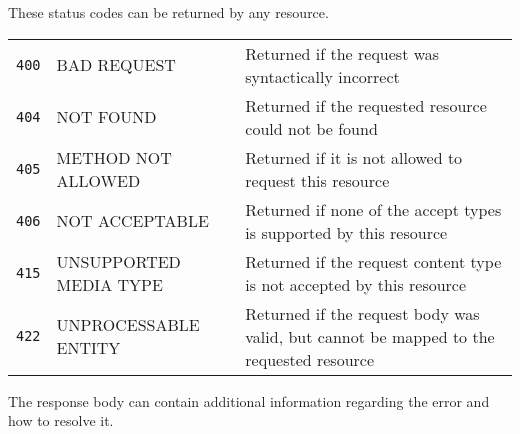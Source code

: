     These status codes can be returned by any resource.
    
    \begin{center}
		\begin{tabularx}{\textwidth}{llX} 
		    \toprule
		    \texttt{400}    &   BAD REQUEST                 &   Returned if the request was syntactically incorrect   \tabularnewline
			\texttt{404}    &   NOT FOUND                   &   Returned if the requested resource could not be found    \tabularnewline
			\texttt{405}    &   METHOD NOT ALLOWED          &   Returned if it is not allowed to request this resource    \tabularnewline
			\texttt{406}    &   NOT ACCEPTABLE              &   Returned if none of the accept types is supported by this resource     \tabularnewline
			\texttt{415}    &   UNSUPPORTED MEDIA TYPE      &   Returned if the request content type is not accepted by this resource \tabularnewline
			\texttt{422}    &   UNPROCESSABLE ENTITY        &   Returned if the request body was valid, but cannot be mapped to the requested resource   \tabularnewline
			\bottomrule
		\end{tabularx}
	\end{center}
    
    The response body can contain additional information regarding the error and how to resolve it.
    
    
    
    
    
            
